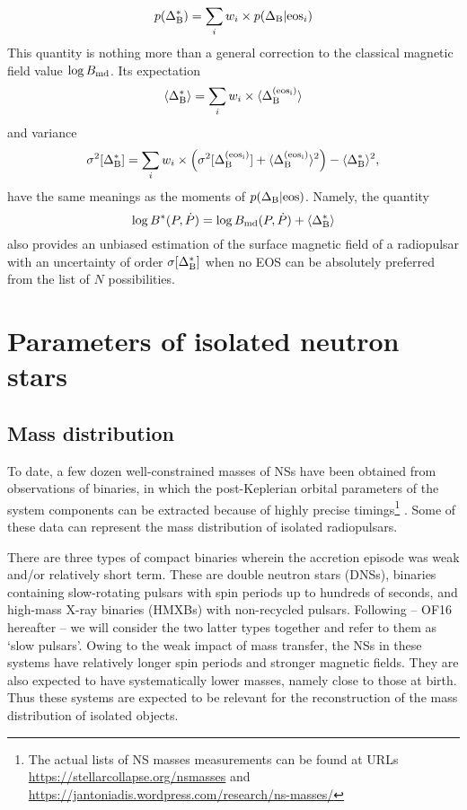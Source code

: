 \documentclass[fleqn,usenatbib]{mnras}
\begin{document}
\begin{equation}
    p(\Delta^*_{\rm B}) = \sum_i w_i \times p(\Delta_{\rm B}\vert{\rm eos}_i)
\end{equation}
This quantity is nothing more than a general correction to the classical magnetic field value $\log B_{\rm md}$.
Its expectation
\begin{equation}
    \langle \Delta^*_{\rm B} \rangle = \sum_i w_i \times \langle \Delta^{\rm (eos_i)}_{\rm B}\rangle
\end{equation}
and variance
\begin{equation}
\sigma^2[\Delta^*_{\rm B}] = \sum_i w_i \times \left
(\sigma^2[\Delta^{\rm (eos_i)}_{\rm B}] + \langle \Delta^{\rm
(eos_i)}_{\rm B}\rangle^2 \right) - \langle \Delta^*_{\rm B}
\rangle^2,
\end{equation}
have the same meanings as the moments of $p(\Delta_{\rm B}\vert{\rm eos})$. Namely, the quantity
\begin{equation}
    \log B^*(P, \dot P) = \log B_{\rm md}(P, \dot P) + \langle \Delta^*_{\rm B}\rangle
\end{equation}
also provides an unbiased estimation of the surface magnetic field of a radiopulsar with an uncertainty of order
$\sigma[\Delta^*_{\rm B}]$ when no EOS can be absolutely preferred from the list of $N$ possibilities.


\section{Parameters of isolated neutron stars}
\label{sect:parameters}

\subsection{Mass distribution}
\label{sect:psr_mass}

To date, a few dozen well-constrained masses of NSs have been obtained from observations of binaries, in which the post-Keplerian orbital parameters of the system components can be extracted because
of highly precise timings\footnote{The actual lists of NS masses measurements can be found at URLs
\url{https://stellarcollapse.org/nsmasses} and \url{https://jantoniadis.wordpress.com/research/ns-masses/}} \citep[e.g][]{lat12,
ant_thesis, ozel16}. Some of these data can represent the mass
distribution of isolated radiopulsars.

There are three types of compact binaries wherein the accretion episode was weak and/or relatively short term. These are double neutron stars (DNSs), binaries containing slow-rotating pulsars
with spin periods up to hundreds of seconds, and high-mass X-ray
binaries (HMXBs) with non-recycled pulsars. Following \cite{ozel16} -- OF16 hereafter -- we will consider the two latter
types together and refer to them as `slow pulsars'. Owing to the
weak impact of mass transfer, the NSs in these systems have relatively longer spin periods and stronger magnetic fields. They are
also expected to have systematically lower masses, namely close to
those at birth. Thus these systems are expected to be relevant for
the reconstruction of the mass distribution of isolated objects.
\end{document}
